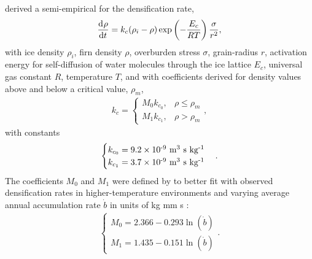 \citet{arthern_2010} derived a semi-empirical for the densification rate,
\begin{align}
  \frac{\mathrm{d}^{} \rho}{\mathrm{d} t^{} } = k_c (\rho_i - \rho) \exp\left(-\frac{E_c}{RT} \right) \frac{\sigma}{r^2},
\end{align}
with ice density $\rho_i$, firn density $\rho$, overburden stress $\sigma$, grain-radius $r$, activation energy for self-diffusion of water molecules through the ice lattice $E_c$, universal gas constant $R$, temperature $T$, and with coefficients derived for density values above and below a critical value, $\rho_m$,   
\begin{align*}
  k_c = 
  \begin{cases}
    M_0 k_{c_0}, &\rho \leq \rho_m\\
    M_1 k_{c_1}, &\rho > \rho_m
  \end{cases},
\end{align*}
with constants 
\begin{align*}
  \begin{cases}
    k_{c_0} = 9.2 \times 10^{\textrm{-9}} \text{ m\ensuremath{^{\textrm{3}}} s kg\ensuremath{^{\textrm{-1}}}} \\
    k_{c_1} = 3.7 \times 10^{\textrm{-9}} \text{ m\ensuremath{^{\textrm{3}}} s kg\ensuremath{^{\textrm{-1}}}}  
  \end{cases}.
\end{align*}
The coefficients $M_0$ and $M_1$ were defined by \citet{ligtenberg_2011} to better fit with observed densification rates in higher-temperature environments and varying average annual accumulation rate $\dot{b}$ in units of kg mm s :
\begin{align*}
  \begin{cases}
    M_0 = 2.366 - 0.293\ln(\dot{b})\\
    M_1 = 1.435 - 0.151\ln(\dot{b})
  \end{cases}.
\end{align*}

